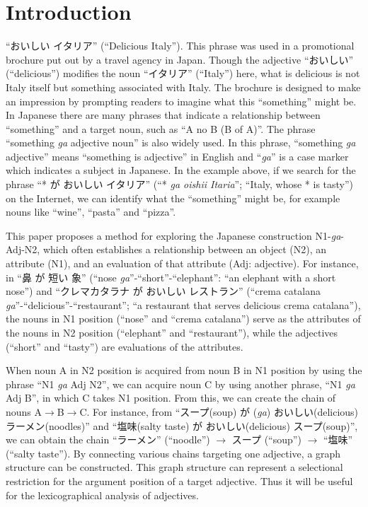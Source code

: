 \documentclass[english]{jnlp_1.4}
\begin{document}
\maketitle

\newcommand{\argmax}{}

\section{Introduction}

``おいしい イタリア'' (``Delicious Italy''). This phrase was used in a
promotional brochure put out by a travel agency in Japan. Though the
adjective ``おいしい'' (``delicious'') modifies the noun ``イタリア''
(``Italy'') here, what is delicious is not Italy itself but something associated
with Italy. The brochure is designed to make an impression by prompting
readers to imagine what this ``something'' might be. In Japanese there
are many phrases that indicate a relationship between ``something'' and
a target noun, such as ``A no B (B of A)''. The phrase ``something {\it ga}
adjective noun'' is also widely used.
In this phrase, ``something {\it ga} adjective'' means ``something is
adjective'' in English and ``{\it ga}'' is a case marker which
indicates a subject in Japanese.  In the example above, if we search
for the phrase ``* が おいしい イタリア'' (``* {\it ga oishii Itaria}'';
``Italy, whose * is tasty'') on the Internet, we can identify what the
``something'' might be, for example nouns like ``wine'', ``pasta'' and
``pizza''.

This paper proposes a method for exploring the Japanese construction
N1-{\it ga}-Adj-N2, which often establishes a relationship between an object
(N2), an attribute (N1), and an evaluation of that attribute (Adj: adjective). For
instance, in ``鼻 が 短い 象'' (``nose {\it ga}''-``short''-``elephant'': ``an
elephant with a short nose'') and ``クレマカタラナ が おいしい レストラン''
(``crema catalana {\it ga}''-``delicious''-``restaurant''; ``a restaurant that
serves delicious crema catalana''), the nouns in N1 position (``nose''
and ``crema catalana'') serve as the attributes of the nouns in N2
position (``elephant'' and ``restaurant''), while the adjectives
(``short'' and ``tasty'') are evaluations of the attributes. 

When noun A in N2 position is acquired from noun B in N1 position by
using the phrase ``N1 {\it ga} Adj N2'', we can acquire noun C by using
another phrase, ``N1 {\it ga} Adj B'', in which C takes N1 position.
From this, we can create the chain of nouns
A${\rightarrow}$B${\rightarrow}$C.  For instance, from ``スープ(soup) が
({\it ga}) おいしい(delicious) ラーメン(noodles)'' and ``塩味(salty taste)
 が おいしい(delicious) スープ(soup)'', we can obtain the chain ``ラーメン''
(``noodle'') ${\rightarrow}$ スープ (``soup'') ${\rightarrow}$ ``塩味''
(``salty taste'').  By connecting various chains targeting one
adjective, a graph structure can be constructed. This graph structure
can represent a selectional restriction for the argument position of a
target adjective. Thus it will be useful for the lexicographical
analysis of adjectives.
\end{document}
